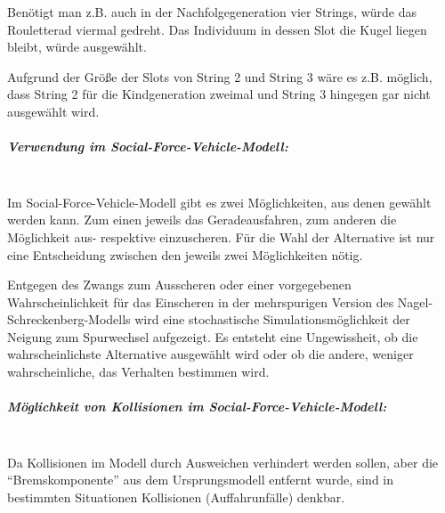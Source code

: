 Benötigt man z.B. auch in der Nachfolgegeneration vier Strings, würde das Rouletterad viermal gedreht.
Das Individuum in dessen Slot die Kugel liegen bleibt, würde ausgewählt.

Aufgrund der Größe der Slots von String 2 und String 3 wäre es z.B. möglich, dass String 2 für die Kindgeneration zweimal und String 3 hingegen gar nicht ausgewählt wird.


\subparagraph{Verwendung im Social-Force-Vehicle-Modell:}
\hfill \\
Im Social-Force-Vehicle-Modell gibt es zwei Möglichkeiten, aus denen gewählt werden kann. 
Zum einen jeweils das Geradeausfahren, zum anderen die Möglichkeit aus- respektive einzuscheren.
Für die Wahl der Alternative ist nur eine Entscheidung zwischen den jeweils zwei Möglichkeiten nötig.

Entgegen des Zwangs zum Ausscheren oder einer vorgegebenen Wahrscheinlichkeit für das Einscheren in der mehrspurigen Version des Nagel-Schreckenberg-Modells wird eine stochastische Simulationsmöglichkeit der Neigung zum Spurwechsel aufgezeigt.
Es entsteht eine Ungewissheit, ob die wahrscheinlichste Alternative ausgewählt wird oder ob die andere, weniger wahrscheinliche, das Verhalten bestimmen wird. 


\subparagraph{Möglichkeit von Kollisionen im Social-Force-Vehicle-Modell:}
\hfill \\
Da Kollisionen im Modell durch Ausweichen verhindert werden sollen, aber die \enquote{Bremskomponente} aus dem Ursprungsmodell entfernt wurde, sind in bestimmten Situationen Kollisionen (Auffahrunfälle) denkbar.

